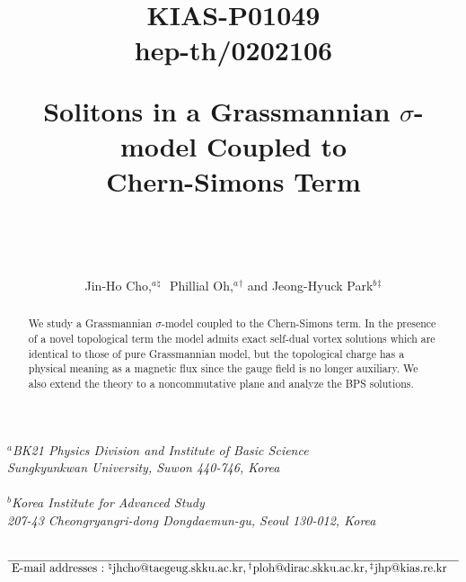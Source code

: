 \documentclass[a4paper,12pt]{article}
\begin{document}
\begin{titlepage}
\title{\vskip -60pt
{\small\begin{flushright}
KIAS-P01049\\
hep-th/0202106
\end{flushright}}
\vskip 45pt
Solitons in a Grassmannian $\sigma$-model Coupled to\\ Chern-Simons Term\\}
\vspace{4.0cm}
\author{\\
\\
\\
Jin-Ho Cho,${}^{a}{}^{\natural}$\,\,
Phillial Oh,${}^{a}{}^{\dagger}$ and Jeong-Hyuck Park${}^{b}{}^{\ddagger}$}
\date{}
\maketitle
\begin{center}
\textit{${}^{a}$BK21 Physics Division and Institute of Basic Science\\
Sungkyunkwan University,
Suwon 440-746, Korea} \\
~\\
\textit{${}^{b}$Korea Institute for Advanced Study}\\
\textit{207-43 Cheongryangri-dong Dongdaemun-gu, Seoul 130-012, Korea}
\end{center}
\vspace{1.0cm}
\begin{abstract}
We study a Grassmannian $\sigma$-model coupled to the Chern-Simons term. In the presence of a novel topological term the model admits exact self-dual
vortex solutions which are identical to those of pure Grassmannian model, but the topological charge has a physical meaning as a magnetic flux since the
gauge field is no longer auxiliary. We also extend the theory to a noncommutative plane and analyze the BPS solutions.
\end{abstract}
~\newline
~\newline
~\newline
~\newline
$\overline{\mbox{
E-mail
addresses\,\,:}~{}^{\natural}\mbox{jhcho@taegeug.skku.ac.kr},{}^{\dagger}
\mbox{ploh@dirac.skku.ac.kr},{}^{\ddagger}\mbox{jhp@kias.re.kr}~~~}$
\thispagestyle{empty}
\end{titlepage}
\newpage
\setcounter{footnote}{0}
\end{document}
